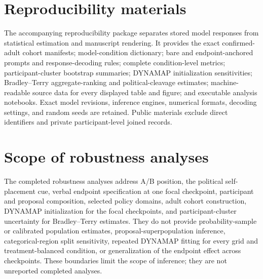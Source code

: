 \documentclass[unnumsec,webpdf,modern,large]{oup-authoring-template}
\begin{document}
\clearpage
\section{Reproducibility materials}

The accompanying reproducibility package separates stored model responses from statistical estimation and manuscript rendering. It provides the exact confirmed-adult cohort manifests; model-condition dictionary; bare and endpoint-anchored prompts and response-decoding rules; complete condition-level metrics; participant-cluster bootstrap summaries; DYNAMAP initialization sensitivities; Bradley--Terry aggregate-ranking and political-cleavage estimates; machine-readable source data for every displayed table and figure; and executable analysis notebooks. Exact model revisions, inference engines, numerical formats, decoding settings, and random seeds are retained. Public materials exclude direct identifiers and private participant-level joined records.

\section{Scope of robustness analyses}

The completed robustness analyses address A/B position, the political self-placement cue, verbal endpoint specification at one focal checkpoint, participant and proposal composition, selected policy domains, adult cohort construction, DYNAMAP initialization for the focal checkpoints, and participant-cluster uncertainty for Bradley--Terry estimates. They do not provide probability-sample or calibrated population estimates, proposal-superpopulation inference, categorical-region split sensitivity, repeated DYNAMAP fitting for every grid and treatment-balanced condition, or generalization of the endpoint effect across checkpoints. These boundaries limit the scope of inference; they are not unreported completed analyses.


\nocite{Abeliuk2026,Argyle2023,Atari2023,Ball2025,Bernardelle2025,Bhattacharyya2026,Bisbee2024,Brinkmann2023,GudinoRosero2024,Lu2025,Navarrete2024,Santurkar2023,Wang2025,Xiao2026}

\end{document}

